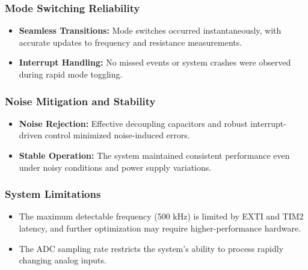 \subsubsection{Mode Switching Reliability}
\begin{itemize}[leftmargin=2em]
    \item \textbf{Seamless Transitions:} Mode switches occurred instantaneously, with accurate updates to frequency and resistance measurements.
    \item \textbf{Interrupt Handling:} No missed events or system crashes were observed during rapid mode toggling.
\end{itemize}

\subsubsection{Noise Mitigation and Stability}
\begin{itemize}[leftmargin=2em]
    \item \textbf{Noise Rejection:} Effective decoupling capacitors and robust interrupt-driven control minimized noise-induced errors.
    \item \textbf{Stable Operation:} The system maintained consistent performance even under noisy conditions and power supply variations.
\end{itemize}

\subsubsection{System Limitations}
\begin{itemize}[leftmargin=2em]
    \item The maximum detectable frequency (500 kHz) is limited by EXTI and TIM2 latency, and further optimization may require higher-performance hardware.
    \item The ADC sampling rate restricts the system's ability to process rapidly changing analog inputs.
\end{itemize}
